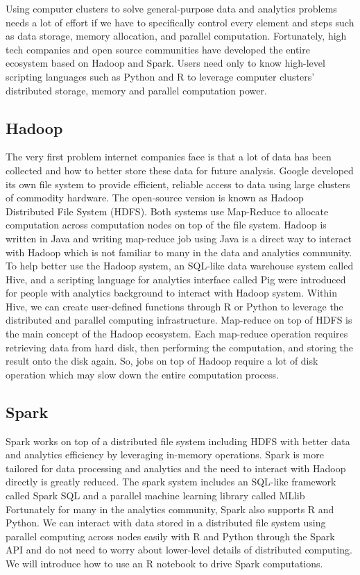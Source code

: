\documentclass[
  12pt,
]{krantz}
\begin{document}
Using computer clusters to solve general-purpose data and analytics problems needs a lot of effort if we have to specifically control every element and steps such as data storage, memory allocation, and parallel computation. Fortunately, high tech companies and open source communities have developed the entire ecosystem based on Hadoop and Spark. Users need only to know high-level scripting languages such as Python and R to leverage computer clusters' distributed storage, memory and parallel computation power.

\hypertarget{hadoop}{%
\subsection{Hadoop}\label{hadoop}}

The very first problem internet companies face is that a lot of data has been collected and how to better store these data for future analysis. Google developed its own file system to provide efficient, reliable access to data using large clusters of commodity hardware. The open-source version is known as Hadoop Distributed File System (HDFS). Both systems use Map-Reduce to allocate computation across computation nodes on top of the file system. Hadoop is written in Java and writing map-reduce job using Java is a direct way to interact with Hadoop which is not familiar to many in the data and analytics community. To help better use the Hadoop system, an SQL-like data warehouse system called Hive, and a scripting language for analytics interface called Pig were introduced for people with analytics background to interact with Hadoop system. Within Hive, we can create user-defined functions through R or Python to leverage the distributed and parallel computing infrastructure. Map-reduce on top of HDFS is the main concept of the Hadoop ecosystem. Each map-reduce operation requires retrieving data from hard disk, then performing the computation, and storing the result onto the disk again. So, jobs on top of Hadoop require a lot of disk operation which may slow down the entire computation process.

\hypertarget{spark}{%
\subsection{Spark}\label{spark}}

Spark works on top of a distributed file system including HDFS with better data and analytics efficiency by leveraging in-memory operations. Spark is more tailored for data processing and analytics and the need to interact with Hadoop directly is greatly reduced. The spark system includes an SQL-like framework called Spark SQL and a parallel machine learning library called MLlib Fortunately for many in the analytics community, Spark also supports R and Python. We can interact with data stored in a distributed file system using parallel computing across nodes easily with R and Python through the Spark API and do not need to worry about lower-level details of distributed computing. We will introduce how to use an R notebook to drive Spark computations.
\end{document}
